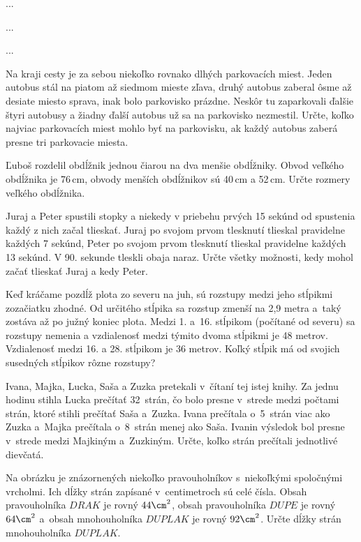 {%
...}

{%
...}

{%
...}

{%
Na kraji cesty je za sebou niekoľko rovnako dlhých parkovacích miest. Jeden autobus stál na piatom až siedmom mieste zľava, druhý autobus zaberal ôsme až desiate miesto sprava, inak bolo parkovisko prázdne. Neskôr tu zaparkovali ďalšie štyri autobusy a žiadny ďalší autobus už sa na parkovisko nezmestil. Určte, koľko najviac parkovacích miest mohlo byť na parkovisku, ak každý autobus zaberá presne tri parkovacie miesta.}

{%
Ľuboš rozdelil obdĺžnik jednou čiarou na dva menšie obdĺžniky. Obvod veľkého obdĺžnika je 76\,cm, obvody menších obdĺžnikov sú 40\,cm a 52\,cm. Určte rozmery veľkého obdĺžnika.}

{%
Juraj a Peter spustili stopky a niekedy v priebehu prvých 15 sekúnd od spustenia každý z nich začal tlieskať. Juraj po svojom prvom tlesknutí tlieskal pravidelne každých 7 sekúnd, Peter po svojom prvom tlesknutí tlieskal pravidelne každých 13 sekúnd. V 90. sekunde tleskli obaja naraz. Určte všetky možnosti, kedy mohol začať tlieskať Juraj a kedy Peter.}

{%
Keď kráčame pozdĺž plota zo severu na juh, sú rozstupy medzi jeho stĺpikmi zozačiatku zhodné. Od určitého stĺpika sa rozstup zmenší na 2{,}9 metra a~taký zostáva až po južný koniec plota. Medzi 1. a~16. stĺpikom (počítané od severu) sa rozstupy nemenia a vzdialenosť medzi týmito dvoma stĺpikmi je 48 metrov. Vzdialenosť medzi 16. a 28. stĺpikom je 36 metrov. Koľký stĺpik má od svojich susedných stĺpikov rôzne rozstupy?}

{%
Ivana, Majka, Lucka, Saša a Zuzka pretekali v~čítaní tej istej knihy.
Za jednu hodinu stihla Lucka prečítať 32~strán, čo bolo presne v~strede
medzi počtami strán, ktoré stihli prečítať Saša a~Zuzka.
Ivana prečítala o~5~strán viac ako Zuzka a~Majka prečítala o~8~strán menej ako
Saša. Ivanin výsledok bol presne v~strede medzi Majkiným a~Zuzkiným.
Určte, koľko strán prečítali jednotlivé dievčatá.}

{%
Na \ifobrazkyvedla{}obrázku\else\obr{}\fi{} je znázornených niekoľko pravouholníkov s~niekoľkými spoločnými vrcholmi.
Ich dĺžky strán zapísané v~centimetroch sú celé čísla.
Obsah pravouholníka $DRAK$ je rovný $44\cm^2$,
obsah pravouholníka $DUPE$ je rovný $64\cm^2$ a~obsah mnohouholníka
$DUPLAK$ je rovný $92\cm^2$.
Určte dĺžky strán mnohouholníka $DUPLAK$.
\ifobrazkyvedla\else{}\fi
}

